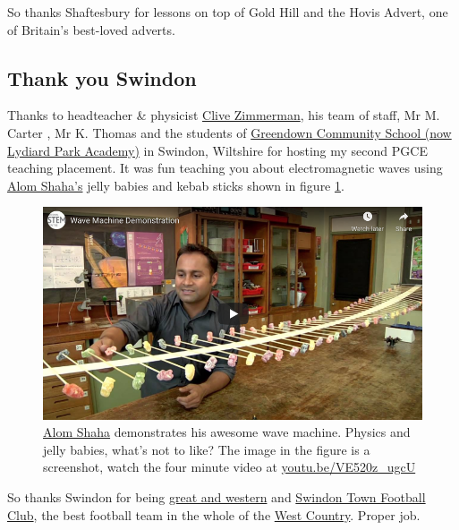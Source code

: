 \documentclass[
]{book}
\begin{document}
So thanks Shaftesbury for lessons on top of Gold Hill and the Hovis Advert, one of Britain's best-loved adverts. \citep{hovisadvert} 🍞

\hypertarget{swindon}{%
\subsection{Thank you Swindon}\label{swindon}}

Thanks to headteacher \& physicist \href{https://www.swindonadvertiser.co.uk/news/14113118.lydiard-school-looking-to-help-others-improve-gcse-results/}{Clive Zimmerman}, his team of staff, Mr M. Carter , Mr K. Thomas and the students of \href{https://en.wikipedia.org/wiki/Lydiard_Park_Academy}{Greendown Community School (now Lydiard Park Academy)} in Swindon, Wiltshire for hosting my second PGCE teaching placement. It was fun teaching you about electromagnetic waves using \href{https://twitter.com/alomshaha}{Alom Shaha's} jelly babies and kebab sticks shown in figure \ref{fig:shaha-fig}.

\begin{figure}

{\centering \includegraphics[width=0.99\linewidth]{images/youtube-alom} 

}

\caption{\href{https://alomshaha.com/}{Alom Shaha} demonstrates his awesome wave machine. Physics and jelly babies, what's not to like? \citep{youtube-alom} The image in the figure is a screenshot, watch the four minute video at \href{https://youtu.be/VE520z_ugcU}{youtu.be/VE520z\_ugcU}}\label{fig:shaha-fig}
\end{figure}



So thanks Swindon for being \href{https://en.wikipedia.org/wiki/Great_Western_Railway}{great and western} and \href{https://en.wikipedia.org/wiki/Swindon_Town_F.C.}{Swindon Town Football Club}, the best football team in the whole of the \href{https://en.wikipedia.org/wiki/West_Country}{West Country}. Proper job. 🙏
\end{document}
